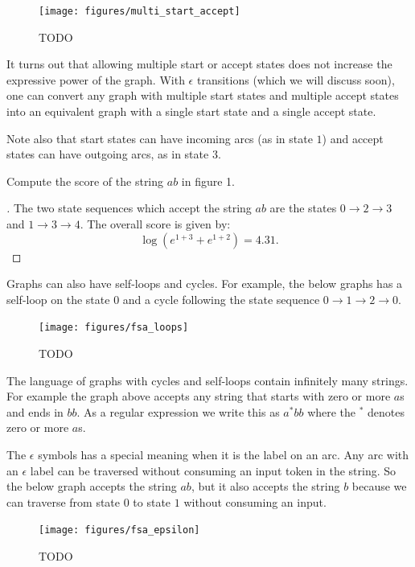 \documentclass[main.tex]{subfiles}
\begin{document}
\begin{figure}
    \centering
    \texttt{[image: figures/multi\_start\_accept]}
    \caption{TODO}
    \label{fig:multi_start_accept}
\end{figure}

It turns out that allowing multiple start or accept states does not increase
the expressive power of the graph. With $\epsilon$ transitions (which we will
discuss soon), one can convert any graph with multiple start states and
multiple accept states into an equivalent graph with a single start state and a
single accept state.

Note also that start states can have incoming arcs (as in state $1$) and accept
states can have outgoing arcs, as in state $3$.

\begin{example}
Compute the score of the string $ab$ in figure 1.
\end{example}

\begin{proof}[\unskip\nopunct]
The two state sequences which accept the string $ab$ are the states $0
\rightarrow 2 \rightarrow 3$ and $1 \rightarrow 3 \rightarrow 4$. The overall
score is given by:
$$
\log (e^{1 + 3} + e^{1 + 2}) = 4.31.
$$
\end{proof}

Graphs can also have self-loops and cycles. For example, the below graphs has a
self-loop on the state $0$ and a cycle following the state sequence $0
\rightarrow 1 \rightarrow 2 \rightarrow 0$.

\begin{figure}
    \centering
    \texttt{[image: figures/fsa\_loops]}
    \caption{TODO}
    \label{fig:fsa_loops}
\end{figure}

The language of graphs with cycles and self-loops contain infinitely many
strings. For example the graph above accepts any string that starts with zero
or more $a$s and ends in $bb$. As a regular expression we write this as $a^*bb$
where the $^*$ denotes zero or more $a$s.

The $\epsilon$ symbols has a special meaning when it is the label on an arc.
Any arc with an $\epsilon$ label can be traversed without consuming an input
token in the string. So the below graph accepts the string $ab$, but it also
accepts the string $b$ because we can traverse from state $0$ to state $1$
without consuming an input.

\begin{figure}
    \centering
    \texttt{[image: figures/fsa\_epsilon]}
    \caption{TODO}
    \label{fig:fsa_epsilon}
\end{figure}
\end{document}
